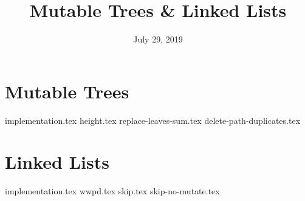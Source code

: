 \documentclass{exam}
\title{Mutable Trees \& Linked Lists}
\date{July 29, 2019}
\begin{document}
\maketitle

\begin{questions}
\section{Mutable Trees}
{implementation.tex}
\newpage
{height.tex}
{replace-leaves-sum.tex}
{delete-path-duplicates.tex}

\section{Linked Lists}
{implementation.tex}
\newpage
{wwpd.tex}
\newpage
{skip.tex}
{skip-no-mutate.tex}
\newpage
\end{questions}
\end{document}
